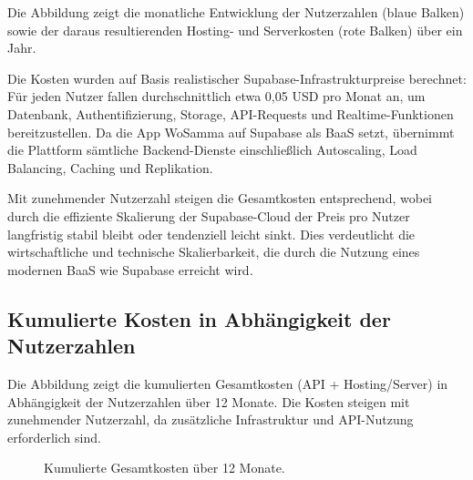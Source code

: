 Die Abbildung zeigt die monatliche Entwicklung der Nutzerzahlen (blaue Balken) sowie der daraus resultierenden Hosting- und Serverkosten (rote Balken) über ein Jahr.

Die Kosten wurden auf Basis realistischer Supabase-Infrastrukturpreise berechnet: Für jeden Nutzer fallen durchschnittlich etwa 0,05 USD pro Monat an, um Datenbank, Authentifizierung, Storage, API-Requests und Realtime-Funktionen bereitzustellen. Da die App WoSamma auf Supabase als BaaS setzt, übernimmt die Plattform sämtliche Backend-Dienste einschließlich Autoscaling, Load Balancing, Caching und Replikation. \cite{SupabaseBilling2026}

Mit zunehmender Nutzerzahl steigen die Gesamtkosten entsprechend, wobei durch die effiziente Skalierung der Supabase-Cloud der Preis pro Nutzer langfristig stabil bleibt oder tendenziell leicht sinkt. Dies verdeutlicht die wirtschaftliche und technische Skalierbarkeit, die durch die Nutzung eines modernen BaaS wie Supabase erreicht wird.

\subsection{Kumulierte Kosten in Abhängigkeit der Nutzerzahlen}

Die Abbildung zeigt die kumulierten Gesamtkosten (API + Hosting/Server) in Abhängigkeit der Nutzerzahlen über 12 Monate.  
Die Kosten steigen mit zunehmender Nutzerzahl, da zusätzliche Infrastruktur und API-Nutzung erforderlich sind.

\begin{figure}[H]
\centering
{}
\caption{Kumulierte Gesamtkosten über 12 Monate.}
\end{figure}

